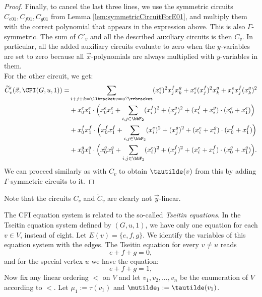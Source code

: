 \documentclass[a4paper,UKenglish,cleveref, autoref, thm-restate]{lipics-v2021}
\begin{document}
\begin{proof}
	Finally, to cancel the last three lines, we use the symmetric circuits $C_{e01}, C_{f01}, C_{g01}$ from Lemma \ref{lem:symmetricCircuitForE01}, and multiply them with the correct polynomial that appears in the expression above. This is also $\Gamma$-symmetric. The sum of $C'_v$ and all the described auxiliary circuits is then $C_v$. In particular, all the added auxiliary circuits evaluate to zero when the $y$-variables are set to zero because all $\vec x$-polynomials are always multiplied with $y$-variables in them.\\
	
	For the other circuit, we get:
	\begin{align*}
		\widetilde{C}'_v(\vec x, \CFI(G, u, 1)) =  &\sum_{i+j+k = \llbracket v = u? \rrbracket} (x^e_i)^2x^f_jx^g_k + x^e_i(x^f_j)^2x^g_k + x^e_ix^f_j(x^g_k)^2\\
		&+x^e_0x^e_1 \cdot \Big(x^e_0x^e_1+\sum_{i,j \in \bbF_2} (x^f_i)^2+(x^g_j)^2 +  (x_i^f+ x_i^g) \cdot (x_0^e + x_1^e) \Big)\\
		&+x^f_0x^f_1\cdot \Big(x^f_0x^f_1+\sum_{i,j \in \bbF_2} (x^e_i)^2+(x^g_j)^2 +  (x_i^e+ x_i^g) \cdot (x_0^f + x_1^f) \Big)\\
		&+ x^g_0x^g_1 \cdot \Big(x^g_0x^g_1+\sum_{i,j \in \bbF_2} (x^e_i)^2+(x^f_j)^2 +  (x_i^e+ x_i^f) \cdot (x_0^g + x_1^g) \Big). 
	\end{align*}
	We can proceed similarly as with $C_v$ to obtain $\tautilde(v)$ from this by adding $\Gamma$-symmetric circuits to it.
\end{proof}	
Note that the circuits $C_v$ and $\widetilde{C}_v$ are clearly not $\vec y$-linear.

The CFI equation system is related to the so-called \emph{Tseitin equations}. In the Tseitin equation system defined by $(G,u,1)$, we have only one equation for each $v \in V$, instead of eight. Let $E(v) = \{e,f,g\}$. We identify the variables of this equation system with the edges. The Tseitin equation for every $v \neq u$ reads
\[
e+f+g = 0,
\] 
and for the special vertex $u$ we have the equation:
\[
e+f+g = 1,
\] 
Now fix any linear ordering $<$ on $V$ and let $v_1,v_2,...,v_n$ be the enumeration of $V$ according to $<$. Let $\mu_1 := \tau(v_1)$ and $\mutilde_1 := \tautilde(v_1)$.\\ 
\end{document}
